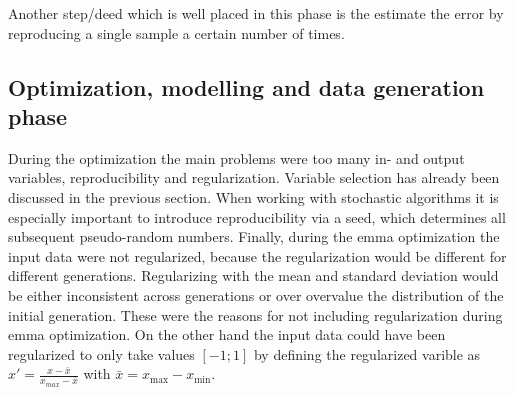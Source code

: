 Another step/deed which is well placed in this phase is the estimate the error by reproducing a single sample a certain number of times. 
%
\subsection{Optimization, modelling and data generation phase}
\label{sec:phase3}
During the optimization the main problems were too many in- and output variables, reproducibility and regularization. 
Variable selection has already been discussed in the previous section. 
When working with stochastic algorithms it is especially important to introduce reproducibility via a seed, which determines all subsequent pseudo-random numbers. 
Finally, during the \gls{emma} optimization the input data were not regularized, %
because the regularization would be different for different generations.
Regularizing with the mean and standard deviation would be either inconsistent across generations or over overvalue the distribution of the initial generation. 
%
These were the reasons for not including regularization during \gls{emma} optimization. 
On the other hand the input data could have been regularized to only take values $[-1;1]$ by defining the regularized varible as 
$x'= \frac{x-\bar{x}}{x_{max} - \bar{x}}$ with $\bar{x}= x_{\text{max}} - x_{\text{min}}$.
\iffalse
\begin{itemize}
    \item regularization
    \item reproducability (random in code and repeat sample)
    \item main problems too many in and output vars
\end{itemize}
\fi
\iffalse
